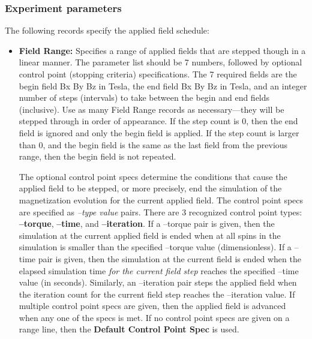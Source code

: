 \subsubsection{Experiment parameters}\label{sec:expparams}
The following records specify the applied field schedule:
\begin{itemize}
   \item {\bf Field Range:} Specifies a range of
      applied fields that are stepped though in a linear manner.  The
      parameter list should be 7 numbers, followed by optional control
      point (stopping criteria) specifications.  The 7 required fields
      are the begin field Bx By Bz in Tesla, the end field Bx By Bz in
      Tesla, and an integer number of steps (intervals) to take between
      the begin and end fields (inclusive).  Use as many Field Range
      records as necessary---they will be stepped through in order of
      appearance.  If the step count is 0, then the end field is ignored
      and only the begin field is applied.  If the step count is larger
      than 0, and the begin field is the same as the last field from the
      previous range, then the begin field is not repeated.

      The optional control point specs
      determine the conditions that cause the applied field to be
      stepped, or more precisely, end the simulation of the
      magnetization evolution for the current applied field.  The
      control point specs are specified as {\em --type value} pairs.
      There are 3 recognized control point types:
      {\bf --torque},
      {\bf --time}, and
      {\bf --iteration}.  If a --torque pair
      is given, then the simulation at the current applied field is
      ended when {} {} at all spins in the simulation is
      smaller than the specified --torque value (dimensionless).  If a
      --time pair is given, then the simulation at the current field is
      ended when the elapsed simulation time {\em for the current field
      step} reaches the specified --time value (in seconds).  Similarly,
      an --iteration pair steps the applied field when the iteration
      count for the current field step reaches the --iteration value.
      If multiple control point specs are given, then the applied field
      is advanced when any one of the specs is met.  If no control point
      specs are given on a range line, then the {\bf Default Control
      Point Spec} is used.


\end{itemize}
